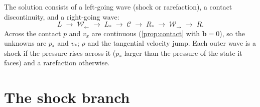\documentclass[11pt,a4paper,oneside,openany]{book}
\theoremstyle{definition}
\theoremstyle{plain}
\theoremstyle{remark}
\begin{document}
The solution consists of a left-going wave (shock or rarefaction), a contact
discontinuity, and a right-going wave:
\begin{equation}
L\;\longrightarrow\;\mathcal W_\leftarrow\;\longrightarrow\;L_\ast\;\longrightarrow\;
\mathcal C\;\longrightarrow\;R_\ast\;\longrightarrow\;\mathcal W_\rightarrow\;
\longrightarrow\;R .
\end{equation}
Across the contact $p$ and $v_x$ are continuous (\cref{prop:contact} with $\bm b=0$), so
the unknowns are $p_\ast$ and $v_\ast$; $\rho$ and the tangential velocity jump. Each
outer wave is a shock if the pressure rises across it ($p_\ast$ larger than the pressure
of the state it faces) and a rarefaction otherwise.

\section{The shock branch}\label{sec:hydro-shock}
\end{document}
